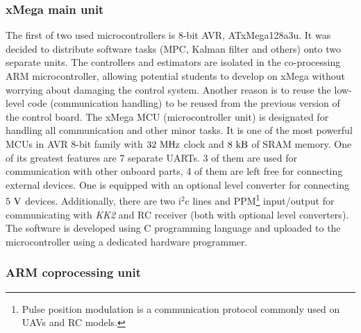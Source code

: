 \subsubsection{xMega main unit}

The first of two used microcontrollers is 8-bit AVR, ATxMega128a3u. It was decided to distribute software tasks (MPC, Kalman filter and others) onto two separate units. The controllers and estimators are isolated in the co-processing ARM microcontroller, allowing potential students to develop on xMega without worrying about damaging the control system. Another reason is to reuse the low-level code (communication handling) to be reused from the previous version of the control board. The xMega MCU (microcontroller unit) is designated for handling all communication and other minor tasks. It is one of the most powerful MCUs in AVR 8-bit family with $32 ~\mathrm{MHz}$ clock and $8 ~\mathrm{kB}$ of SRAM memory. One of its greatest features are 7 separate UARTs. 3 of them are used for communication with other onboard parts, 4 of them are left free for connecting external devices. One is equipped with an optional level converter for connecting $5 ~\mathrm{V}$ devices. Additionally, there are two $\mathrm{i}^2\mathrm{c}$ lines and PPM\footnote{Pulse position modulation is a communication protocol commonly used on UAVs and RC models.} input/output for communicating with \textit{KK2} and RC receiver (both with optional level converters). The software is developed using C programming language and uploaded to the microcontroller using a dedicated hardware programmer.

\subsubsection{ARM coprocessing unit}

